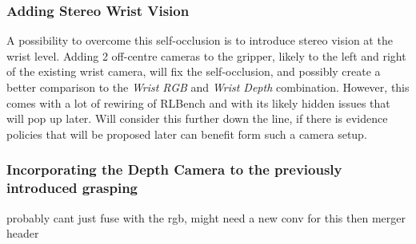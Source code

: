 \subsubsection{Adding Stereo Wrist Vision}
A possibility to overcome this self-occlusion is to introduce stereo vision at the wrist level. Adding 2 off-centre cameras to the gripper, likely to the left and right of the existing wrist camera, will fix the self-occlusion, and possibly create a better comparison to the \emph{Wrist RGB} and \emph{Wrist Depth} combination. However, this comes with a lot of rewiring of RLBench and with its likely hidden issues that will pop up later. Will consider this further down the line, if there is evidence policies that will be proposed later can benefit form such a camera setup.



\subsubsection{Incorporating the Depth Camera to the previously introduced grasping}
probably cant just fuse with the rgb, might need a new conv for this then merger header


